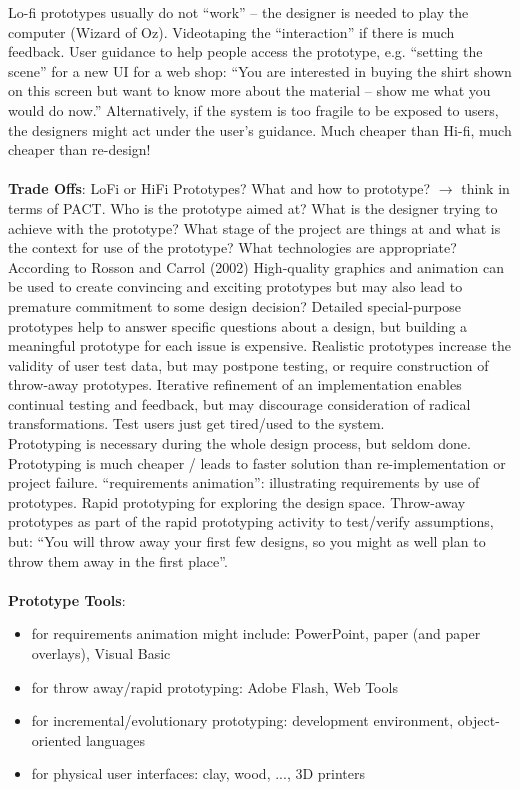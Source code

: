 Lo-fi prototypes usually do not ``work'' -- the designer is needed to play the computer (Wizard of Oz). Videotaping the ``interaction'' if there is much feedback. User guidance to help people access the prototype, e.g. ``setting the scene'' for a new UI for a web shop: ``You are interested in buying the shirt shown on this screen but want to know more about the material – show me what you would do now.'' Alternatively, if the system is too fragile to be exposed to users, the designers might act under the user's guidance. Much cheaper than Hi-fi, much cheaper than re-design!\\\\
\textbf{Trade Offs}: LoFi or HiFi Prototypes? What and how to prototype? $\rightarrow$ think in terms of PACT. Who is the prototype aimed at? What is the designer trying to achieve with the prototype? What stage of the project are things at and what is the context for use of the prototype? What technologies are appropriate?\\
According to Rosson and Carrol (2002) High-quality graphics and animation can be used to create convincing and exciting prototypes but may also lead to premature commitment to some design decision? Detailed special-purpose prototypes help to answer specific questions about a design, but building a meaningful prototype for each issue is expensive. Realistic prototypes increase the validity of user test data, but may postpone testing, or require construction of throw-away prototypes. Iterative refinement of an implementation enables continual testing and feedback, but may discourage consideration of radical transformations. Test users just get tired/used to the system.\\
Prototyping is necessary during the whole design process, but seldom done. Prototyping is much cheaper / leads to faster solution than re-implementation or project failure. ``requirements animation'': illustrating requirements by use of prototypes. Rapid prototyping for exploring the design space. Throw-away prototypes as part of the rapid prototyping activity to test/verify assumptions, but: ``You will throw away your first few designs, so you might as well plan to throw them away in the first place''.\\\\
\textbf{Prototype Tools}: 
\begin{itemize}
\item for requirements animation might include: PowerPoint, paper (and paper overlays), Visual Basic
\item for throw away/rapid prototyping: Adobe Flash, Web Tools
\item for incremental/evolutionary prototyping: development environment, object-oriented languages
\item for physical user interfaces: clay, wood, ..., 3D printers
\end{itemize}